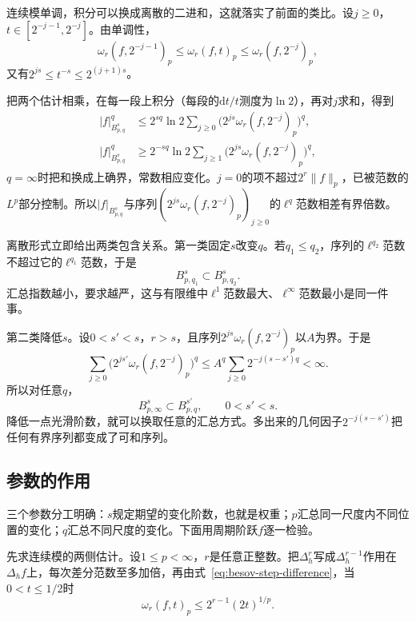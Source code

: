 连续模单调，积分可以换成离散的二进和，这就落实了前面的类比。设$j\geq0$，$t\in[2^{-j-1},2^{-j}]$。由单调性，
\[
 \omega_r(f,2^{-j-1})_p\leq\omega_r(f,t)_p\leq\omega_r(f,2^{-j})_p,
\]
又有$2^{js}\leq t^{-s}\leq2^{(j+1)s}$。

把两个估计相乘，在每一段上积分（每段的$\mathrm dt/t$测度为$\ln2$），再对$j$求和，得到
\begin{equation}
 \begin{aligned}
 \lvert f\rvert_{B^s_{p,q}}^q&\leq2^{sq}\ln2\sum_{j\geq0}\bigl(2^{js}\omega_r(f,2^{-j})_p\bigr)^q,\\
 \lvert f\rvert_{B^s_{p,q}}^q&\geq2^{-sq}\ln2\sum_{j\geq1}\bigl(2^{js}\omega_r(f,2^{-j})_p\bigr)^q ,
 \end{aligned}
 \label{eq:besov-dyadic-form}
\end{equation}
$q=\infty$时把和换成上确界，常数相应变化。$j=0$的项不超过$2^r\lVert f\rVert_p$，已被范数的$L^p$部分控制。所以$\lvert f\rvert_{B^s_{p,q}}$与序列$(2^{js}\omega_r(f,2^{-j})_p)_{j\geq0}$的$\ell^q$范数相差有界倍数。

离散形式立即给出两类包含关系。第一类固定$s$改变$q$。若$q_1\leq q_2$，序列的$\ell^{q_2}$范数不超过它的$\ell^{q_1}$范数，于是
\begin{equation}
 B^s_{p,q_1}\subset B^s_{p,q_2}.
 \label{eq:besov-inclusion-q}
\end{equation}
汇总指数越小，要求越严，这与有限维中$\ell^1$范数最大、$\ell^\infty$范数最小是同一件事。

第二类降低$s$。设$0<s'<s$，$r>s$，且序列$2^{js}\omega_r(f,2^{-j})_p$以$A$为界。于是
\[
 \sum_{j\geq0}\bigl(2^{js'}\omega_r(f,2^{-j})_p\bigr)^q\leq A^q\sum_{j\geq0}2^{-j(s-s')q}<\infty .
\]
所以对任意$q$，
\begin{equation}
 B^s_{p,\infty}\subset B^{s'}_{p,q},\qquad0<s'<s .
 \label{eq:besov-inclusion-s}
\end{equation}
降低一点光滑阶数，就可以换取任意的汇总方式。多出来的几何因子$2^{-j(s-s')}$把任何有界序列都变成了可和序列。

\subsection{参数的作用}
\label{sec:besov-parameters}

三个参数分工明确：$s$规定期望的变化阶数，也就是权重；$p$汇总同一尺度内不同位置的变化；$q$汇总不同尺度的变化。下面用周期阶跃$f$逐一检验。

先求连续模的两侧估计。设$1\leq p<\infty$，$r$是任意正整数。把$\Delta_h^r$写成$\Delta_h^{r-1}$作用在$\Delta_hf$上，每次差分范数至多加倍，再由式~\eqref{eq:besov-step-difference}，当$0<t\leq1/2$时
\[
 \omega_r(f,t)_p\leq2^{r-1}(2t)^{1/p}.
\]

